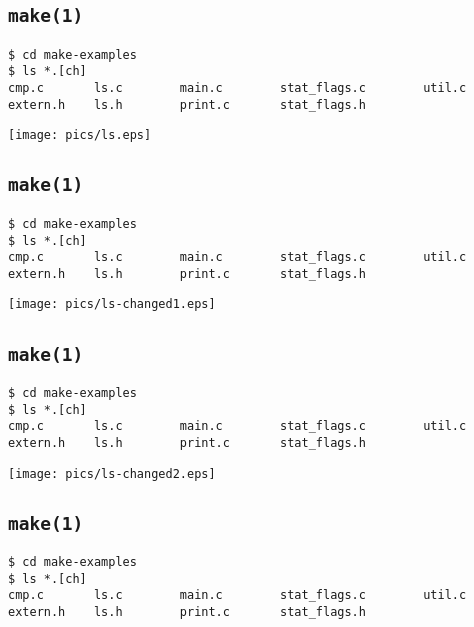 \documentclass[xga]{xdvislides}
\begin{document}
\subsection{{\tt make(1)}}

\begin{verbatim}
$ cd make-examples
$ ls *.[ch]
cmp.c       ls.c        main.c        stat_flags.c        util.c
extern.h    ls.h        print.c       stat_flags.h
\end{verbatim}

\begin{center}
	\texttt{[image: pics/ls.eps]}
\end{center}

\subsection{{\tt make(1)}}

\begin{verbatim}
$ cd make-examples
$ ls *.[ch]
cmp.c       ls.c        main.c        stat_flags.c        util.c
extern.h    ls.h        print.c       stat_flags.h
\end{verbatim}

\begin{center}
	\texttt{[image: pics/ls-changed1.eps]}
\end{center}

\subsection{{\tt make(1)}}

\begin{verbatim}
$ cd make-examples
$ ls *.[ch]
cmp.c       ls.c        main.c        stat_flags.c        util.c
extern.h    ls.h        print.c       stat_flags.h
\end{verbatim}

\begin{center}
	\texttt{[image: pics/ls-changed2.eps]}
\end{center}

\subsection{{\tt make(1)}}

\begin{verbatim}
$ cd make-examples
$ ls *.[ch]
cmp.c       ls.c        main.c        stat_flags.c        util.c
extern.h    ls.h        print.c       stat_flags.h
\end{verbatim}
\end{document}
